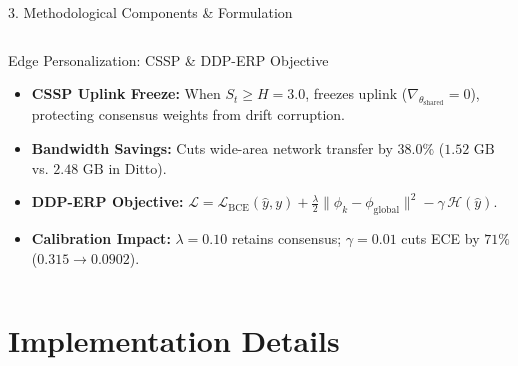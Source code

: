 \documentclass[aspectratio=169, 11pt]{beamer}
\begin{document}
\begin{frame}{3. Methodological Components \& Formulation}
\begin{columns}[T]
        \begin{block}{Edge Personalization: CSSP \& DDP-ERP Objective}
            \scriptsize
            \begin{itemize}
                \item \textbf{CSSP Uplink Freeze:} When $S_t \ge H = 3.0$, freezes uplink ($\nabla_{\theta_{\text{shared}}} = 0$), protecting consensus weights from drift corruption.
                \item \textbf{Bandwidth Savings:} Cuts wide-area network transfer by $38.0\%$ ($1.52\text{ GB}$ vs. $2.48\text{ GB}$ in Ditto).
                \item \textbf{DDP-ERP Objective:}
                $\mathcal{L} = \mathcal{L}_{\text{BCE}}(\hat{y}, y) + \frac{\lambda}{2} \|\phi_k - \phi_{\text{global}}\|^2 - \gamma \, \mathcal{H}(\hat{y})$.
                \item \textbf{Calibration Impact:} $\lambda = 0.10$ retains consensus; $\gamma = 0.01$ cuts ECE by $71\%$ ($0.315 \rightarrow 0.0902$).
            \end{itemize}
        \end{block}
    \end{columns}
\end{frame}

\section{Implementation Details}
\end{document}
